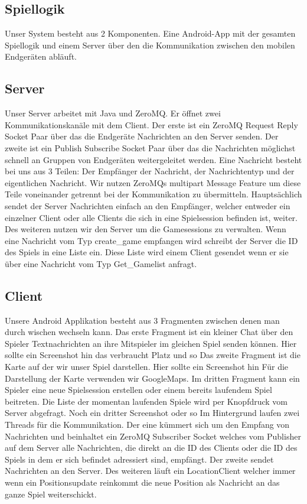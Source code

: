 \subsection{Spiellogik}
Unser System besteht aus 2 Komponenten. Eine Android-App mit der gesamten Spiellogik und einem Server über den die Kommunikation zwischen den mobilen Endgeräten abläuft.

\subsection{Server}
Unser Server arbeitet mit Java und ZeroMQ. Er öffnet zwei Kommunikationskanäle mit dem Client. Der erste ist ein ZeroMQ Request Reply Socket Paar über das die Endgeräte Nachrichten an den Server senden. Der zweite ist ein Publish Subscribe Socket Paar über das die Nachrichten möglichst schnell an Gruppen von Endgeräten weitergeleitet werden. Eine Nachricht besteht bei uns aus 3 Teilen: Der Empfänger der Nachricht,  der Nachrichtentyp und der eigentlichen Nachricht. Wir nutzen ZeroMQs multipart Message Feature um diese Teile voneinander getrennt bei der Kommunikation zu übermitteln. Hauptsächlich sendet der Server Nachrichten einfach an den Empfänger, welcher entweder ein einzelner Client oder alle Clients die sich in eine Spielsession befinden ist, weiter. Des weiteren nutzen wir den Server um die Gamesessions zu verwalten. Wenn eine Nachricht vom Typ create_game empfangen wird schreibt der Server die ID des Spiels in eine Liste ein. Diese Liste wird einem Client gesendet wenn er sie über eine Nachricht vom Typ Get_Gamelist anfragt.

\subsection{Client}
Unsere Android Applikation besteht aus 3 Fragmenten zwischen denen man durch wischen wechseln kann. Das erste Fragment ist ein kleiner Chat über den Spieler Textnachrichten an ihre Mitspieler im gleichen Spiel senden können. {Hier sollte ein Screenshot hin das verbraucht Platz und so}
Das zweite Fragment ist die Karte auf der wir unser Spiel darstellen. {Hier sollte ein Screenshot hin} 
Für die Darstellung der Karte verwenden wir GoogleMaps. 
Im dritten Fragment kann ein Spieler eine neue Spielsession erstellen oder einem bereits laufendem Spiel beitreten. Die Liste der momentan laufenden Spiele wird per Knopfdruck vom Server abgefragt. {Noch ein dritter Screenshot oder so}
Im Hintergrund laufen zwei Threads für die Kommunikation. Der eine kümmert sich um den Empfang von Nachrichten und beinhaltet ein ZeroMQ Subscriber Socket welches vom Publisher auf dem Server alle Nachrichten, die direkt an die ID des Clients oder die ID des Spiels in dem er sich befindet adressiert sind, empfängt. Der zweite sendet Nachrichten an den Server. Des weiteren läuft ein LocationClient welcher immer wenn ein Positionsupdate reinkommt die neue Position als Nachricht an das ganze Spiel weiterschickt.

